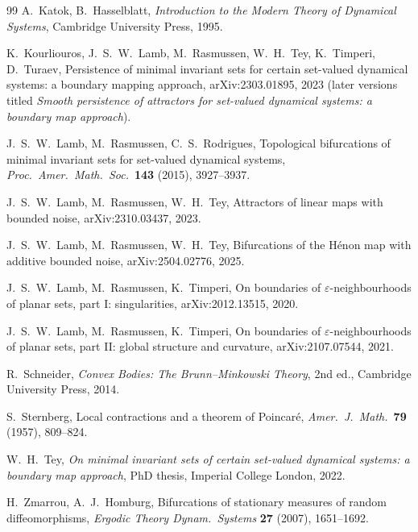 \documentclass[11pt,a4paper]{article}
\theoremstyle{definition}
\theoremstyle{remark}
\newcommand{\eps}{\varepsilon}
\begin{document}
\begin{thebibliography}{99}
 A.~Katok, B.~Hasselblatt, \emph{Introduction to the Modern Theory of Dynamical Systems}, Cambridge
University Press, 1995.

 K.~Kourliouros, J.~S.~W.~Lamb, M.~Rasmussen, W.~H.~Tey, K.~Timperi, D.~Turaev, Persistence of minimal
invariant sets for certain set-valued dynamical systems: a boundary mapping approach, arXiv:2303.01895, 2023 (later
versions titled \emph{Smooth persistence of attractors for set-valued dynamical systems: a boundary map approach}).

 J.~S.~W.~Lamb, M.~Rasmussen, C.~S.~Rodrigues, Topological bifurcations of minimal invariant sets for
set-valued dynamical systems, \emph{Proc.\ Amer.\ Math.\ Soc.}\ \textbf{143} (2015), 3927--3937.

 J.~S.~W.~Lamb, M.~Rasmussen, W.~H.~Tey, Attractors of linear maps with bounded noise, arXiv:2310.03437, 2023.

 J.~S.~W.~Lamb, M.~Rasmussen, W.~H.~Tey, Bifurcations of the H\'enon map with additive bounded noise,
arXiv:2504.02776, 2025.

 J.~S.~W.~Lamb, M.~Rasmussen, K.~Timperi, On boundaries of $\eps$-neighbourhoods of planar sets, part I:
singularities, arXiv:2012.13515, 2020.

 J.~S.~W.~Lamb, M.~Rasmussen, K.~Timperi, On boundaries of $\eps$-neighbourhoods of planar sets, part II:
global structure and curvature, arXiv:2107.07544, 2021.

 R.~Schneider, \emph{Convex Bodies: The Brunn--Minkowski Theory}, 2nd ed., Cambridge University Press, 2014.

 S.~Sternberg, Local contractions and a theorem of Poincar\'e, \emph{Amer.\ J.\ Math.}\ \textbf{79} (1957),
809--824.

 W.~H.~Tey, \emph{On minimal invariant sets of certain set-valued dynamical systems: a boundary map approach},
PhD thesis, Imperial College London, 2022.

 H.~Zmarrou, A.~J.~Homburg, Bifurcations of stationary measures of random diffeomorphisms, \emph{Ergodic
Theory Dynam.\ Systems} \textbf{27} (2007), 1651--1692.
\end{thebibliography}
\end{document}
